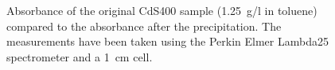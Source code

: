 \documentclass[cits]{JINST}
\begin{document}
\begin{figure}
      \begin{center}
        \caption[]{Absorbance of the original CdS400 sample (1.25~g/l in toluene) compared to the absorbance after the precipitation. The measurements have been taken using the Perkin Elmer Lambda25 spectrometer and a 1~cm cell. \label{cds400_precipitation}}
        \end{center}
\end{figure}
\end{document}
